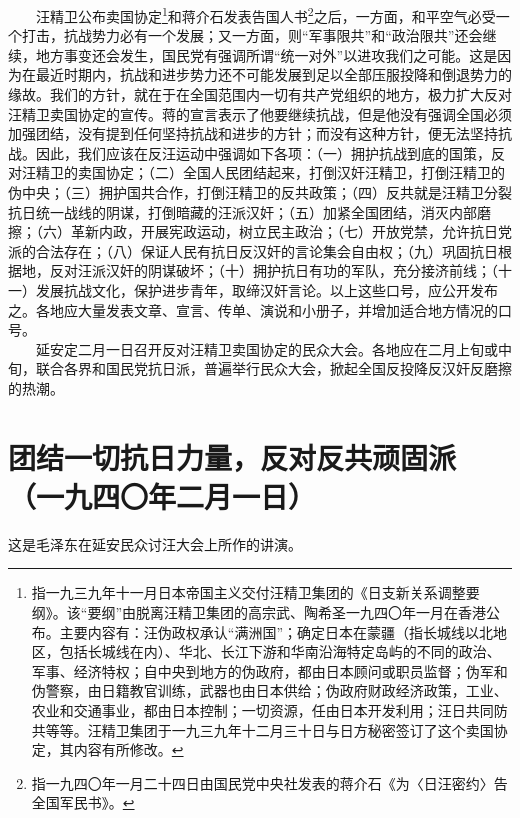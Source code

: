 \documentclass[cn,11pt,chinese]{elegantbook}
\def\myformat#1{\hfil\hfil #1}
\begin{document}
　　汪精卫公布卖国协定\footnote[1]{ 指一九三九年十一月日本帝国主义交付汪精卫集团的《日支新关系调整要纲》。该“要纲”由脱离汪精卫集团的高宗武、陶希圣一九四〇年一月在香港公布。主要内容有：汪伪政权承认“满洲国”；确定日本在蒙疆（指长城线以北地区，包括长城线在内）、华北、长江下游和华南沿海特定岛屿的不同的政治、军事、经济特权；自中央到地方的伪政府，都由日本顾问或职员监督；伪军和伪警察，由日籍教官训练，武器也由日本供给；伪政府财政经济政策，工业、农业和交通事业，都由日本控制；一切资源，任由日本开发利用；汪日共同防共等等。汪精卫集团于一九三九年十二月三十日与日方秘密签订了这个卖国协定，其内容有所修改。}和蒋介石发表告国人书\footnote[2]{ 指一九四〇年一月二十四日由国民党中央社发表的蒋介石《为〈日汪密约〉告全国军民书》。}之后，一方面，和平空气必受一个打击，抗战势力必有一个发展；又一方面，则“军事限共”和“政治限共”还会继续，地方事变还会发生，国民党有强调所谓“统一对外”以进攻我们之可能。这是因为在最近时期内，抗战和进步势力还不可能发展到足以全部压服投降和倒退势力的缘故。我们的方针，就在于在全国范围内一切有共产党组织的地方，极力扩大反对汪精卫卖国协定的宣传。蒋的宣言表示了他要继续抗战，但是他没有强调全国必须加强团结，没有提到任何坚持抗战和进步的方针；而没有这种方针，便无法坚持抗战。因此，我们应该在反汪运动中强调如下各项：（一）拥护抗战到底的国策，反对汪精卫的卖国协定；（二）全国人民团结起来，打倒汉奸汪精卫，打倒汪精卫的伪中央；（三）拥护国共合作，打倒汪精卫的反共政策；（四）反共就是汪精卫分裂抗日统一战线的阴谋，打倒暗藏的汪派汉奸；（五）加紧全国团结，消灭内部磨擦；（六）革新内政，开展宪政运动，树立民主政治；（七）开放党禁，允许抗日党派的合法存在；（八）保证人民有抗日反汉奸的言论集会自由权；（九）巩固抗日根据地，反对汪派汉奸的阴谋破坏；（十）拥护抗日有功的军队，充分接济前线；（十一）发展抗战文化，保护进步青年，取缔汉奸言论。以上这些口号，应公开发布之。各地应大量发表文章、宣言、传单、演说和小册子，并增加适合地方情况的口号。\\
　　延安定二月一日召开反对汪精卫卖国协定的民众大会。各地应在二月上旬或中旬，联合各界和国民党抗日派，普遍举行民众大会，掀起全国反投降反汉奸反磨擦的热潮。\\
\newpage\section*{\myformat{团结一切抗日力量，反对反共顽固派}\\\myformat{（一九四〇年二月一日）}}
\begin{introduction}\item  这是毛泽东在延安民众讨汪大会上所作的讲演。\end{introduction}
\end{document}
